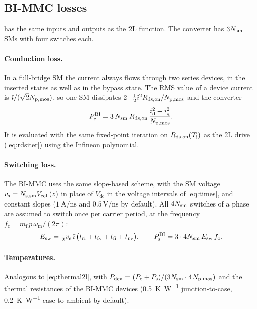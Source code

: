 \subsection{BI-MMC losses}\label{sec:lossbimmc}
 has the same inputs and outputs as the 2L function. The converter has $3N_\mathrm{sm}$ SMs with four switches each.

\paragraph{Conduction loss.} In a full-bridge SM the current always flows through two series devices, in the inserted states as well as in the bypass state. The RMS value of a device current is $\hat\imath/(\sqrt2N_\mathrm{p,mos})$, so one SM dissipates $2\cdot\tfrac12\hat\imath^2R_\mathrm{ds,on}/N_\mathrm{p,mos}$ and the converter
\begin{equation}
P_\mathrm{c}^\mathrm{BI}=3\,N_\mathrm{sm}\,R_\mathrm{ds,on}\,\frac{i_\mathrm{d}^2+i_\mathrm{q}^2}{N_\mathrm{p,mos}}.
\label{eq:pcbimmc}
\end{equation}
It is evaluated with the same fixed-point iteration on $R_\mathrm{ds,on}(T_\mathrm{j})$ as the 2L drive (\cref{eq:rdsiter}) using the Infineon polynomial.

\paragraph{Switching loss.} The BI-MMC uses the same slope-based scheme, with the SM voltage $v_\mathrm{s}=N_\mathrm{s,sm} V_\mathrm{cell}(z)$ in place of $V_\mathrm{dc}$ in the voltage intervals of \cref{eq:times}, and constant slopes ($\SI{1}{\ampere\per\nano\second}$ and $\SI{0.5}{\volt\per\nano\second}$ by default). All $4N_\mathrm{sm}$ switches of a phase are assumed to switch once per carrier period, at the frequency $f_\mathrm{c}=m_\mathrm{f}\,p\,\omega_\mathrm{m}/(2\pi)$:
\begin{equation}
E_\mathrm{sw}=\tfrac12v_\mathrm{s}\,\bar\imath\,\big(t_\mathrm{ri}+t_\mathrm{fv}+t_\mathrm{fi}+t_\mathrm{rv}\big),\qquad
P_\mathrm{s}^\mathrm{BI}=3\cdot4N_\mathrm{sm}\,E_\mathrm{sw}\,f_\mathrm{c}.
\label{eq:psbimmc}
\end{equation}

\paragraph{Temperatures.} Analogous to \cref{eq:thermal2l}, with $P_\mathrm{dev}=(P_\mathrm{c}+P_\mathrm{s})/(3N_\mathrm{sm}\cdot4N_\mathrm{p,mos})$ and the thermal resistances of the BI-MMC devices (\SI{0.5}{\kelvin\per\watt} junction-to-case, \SI{0.2}{\kelvin\per\watt} case-to-ambient by default).

